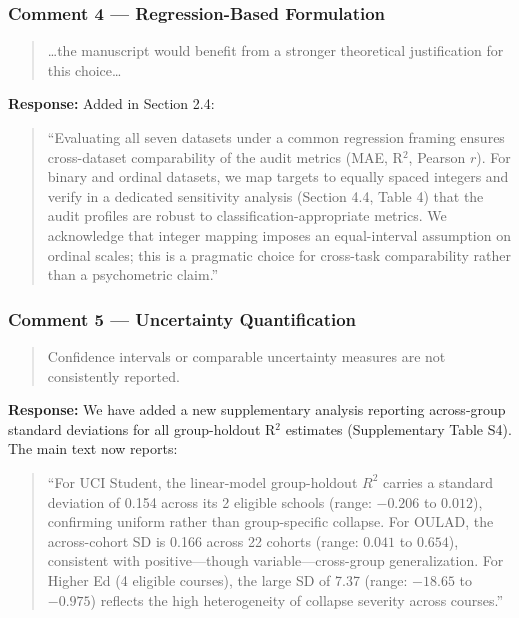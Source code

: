 \documentclass[12pt,a4paper]{article}
\begin{document}
\subsubsection*{Comment 4 --- Regression-Based Formulation}

\begin{quote}
\ldots the manuscript would benefit from a stronger theoretical justification for this choice\ldots
\end{quote}

\textbf{Response:} Added in Section 2.4:

\begin{quote}
``Evaluating all seven datasets under a common regression framing ensures cross-dataset comparability of the audit metrics (MAE, R$^2$, Pearson $r$). For binary and ordinal datasets, we map targets to equally spaced integers and verify in a dedicated sensitivity analysis (Section 4.4, Table 4) that the audit profiles are robust to classification-appropriate metrics. We acknowledge that integer mapping imposes an equal-interval assumption on ordinal scales; this is a pragmatic choice for cross-task comparability rather than a psychometric claim.''
\end{quote}

\subsubsection*{Comment 5 --- Uncertainty Quantification}

\begin{quote}
Confidence intervals or comparable uncertainty measures are not consistently reported.
\end{quote}

\textbf{Response:} We have added a new supplementary analysis reporting across-group standard deviations for all group-holdout R$^2$ estimates (Supplementary Table S4). The main text now reports:

\begin{quote}
``For UCI Student, the linear-model group-holdout $R^2$ carries a standard deviation of 0.154 across its 2 eligible schools (range: $-0.206$ to $0.012$), confirming uniform rather than group-specific collapse. For OULAD, the across-cohort SD is 0.166 across 22 cohorts (range: $0.041$ to $0.654$), consistent with positive---though variable---cross-group generalization. For Higher Ed (4 eligible courses), the large SD of 7.37 (range: $-18.65$ to $-0.975$) reflects the high heterogeneity of collapse severity across courses.''
\end{quote}
\end{document}
